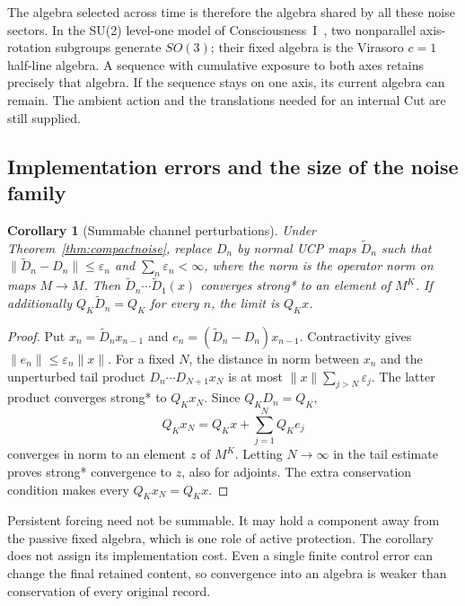 \documentclass[12pt]{article}
\newtheorem{corollary}[theorem]{Corollary}
\theoremstyle{definition}
\theoremstyle{remark}
\begin{document}
The algebra selected across time is therefore the algebra shared by
all these noise sectors. In the SU(2) level-one model of
Consciousness~I~\cite{PaperI}, two nonparallel axis-rotation
subgroups generate \(SO(3)\); their fixed algebra is the
Virasoro \(c=1\) half-line algebra. A sequence with cumulative
exposure to both axes retains precisely that algebra. If the
sequence stays on one axis, its current algebra can remain.
The ambient action and the translations needed for an internal
Cut are still supplied.

\subsection{Implementation errors and the size of the noise family}

\begin{corollary}[Summable channel perturbations]\label{cor:noiseperturb}
Under Theorem~\ref{thm:compactnoise}, replace \(D_n\) by normal UCP
maps \(\widetilde D_n\) such that
\(\|\widetilde D_n-D_n\|\le\varepsilon_n\) and
\(\sum_n\varepsilon_n<\infty\), where the norm is the operator
norm on maps \(M\to M\). Then
\(\widetilde D_n\cdots\widetilde D_1(x)\) converges strong*
to an element of \(M^K\). If additionally
\(Q_K\widetilde D_n=Q_K\) for every \(n\), the limit is \(Q_Kx\).
\end{corollary}
\begin{proof}
Put \(x_n=\widetilde D_nx_{n-1}\) and
\(e_n=(\widetilde D_n-D_n)x_{n-1}\).
Contractivity gives \(\|e_n\|\le\varepsilon_n\|x\|\).
For a fixed \(N\), the distance in norm between \(x_n\) and the
unperturbed tail product \(D_n\cdots D_{N+1}x_N\) is at most
\(\|x\|\sum_{j>N}\varepsilon_j\).
The latter product converges strong* to \(Q_Kx_N\).
Since \(Q_KD_n=Q_K\),
\[
 Q_Kx_N=Q_Kx+\sum_{j=1}^N Q_Ke_j
\]
converges in norm to an element \(z\) of \(M^K\).
Letting \(N\to\infty\) in the tail estimate proves strong*
convergence to \(z\), also for adjoints. The extra conservation
condition makes every \(Q_Kx_N=Q_Kx\).
\end{proof}

Persistent forcing need not be summable. It may hold a component
away from the passive fixed algebra, which is one role of active
protection. The corollary does not assign its implementation cost.
Even a single finite control error can change the final retained
content, so convergence into an algebra is weaker than conservation
of every original record.
\end{document}
